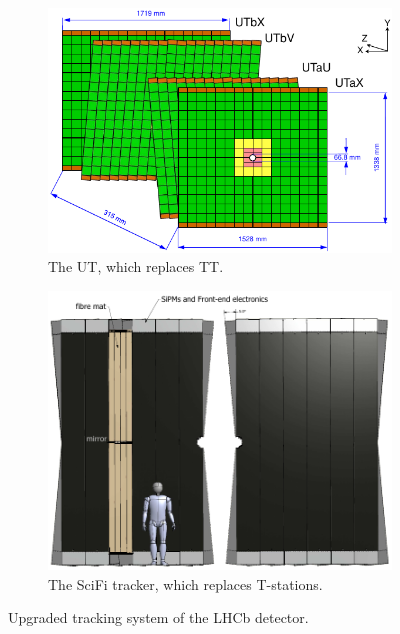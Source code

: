 \begin{figure}[!htb]
    \begin{subfigure}[t]{0.48\textwidth}
        \centering
        \includegraphics[width=\textwidth]{./figs-lhcb-upgrade-overview/tracking/ut_upgrade.pdf}
        \caption{The UT, which replaces TT.}
        \label{fig:ut-upgrade}
    \end{subfigure}
    \hfill
    \begin{subfigure}[t]{0.48\textwidth}
        \centering
        \includegraphics[width=\textwidth]{./figs-lhcb-upgrade-overview/tracking/scifi_upgrade.pdf}
        \caption{The SciFi tracker, which replaces T-stations.}
        \label{fig:scifi-upgrade}
    \end{subfigure}

    \caption{
        Upgraded tracking system of the LHCb detector.
    }
    \label{fig:cpu-vs-gpu-hlt1}
\end{figure}

